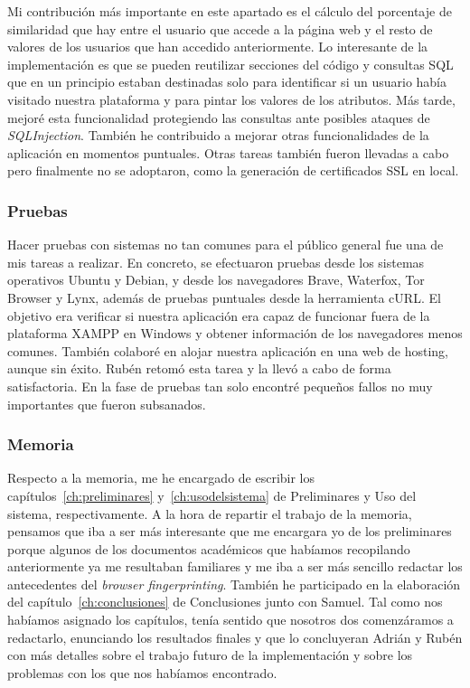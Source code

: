 Mi contribución más importante en este apartado es el cálculo del porcentaje de similaridad que hay entre el usuario que accede a la página web y el resto de valores de los usuarios que han accedido anteriormente. Lo interesante de la implementación es que se pueden reutilizar secciones del código y consultas SQL que en un principio estaban destinadas solo para identificar si un usuario había visitado nuestra plataforma y para pintar los valores de los atributos. Más tarde, mejoré esta funcionalidad protegiendo las consultas ante posibles ataques de \textit{SQLInjection}. También he contribuido a mejorar otras funcionalidades de la aplicación en momentos puntuales. Otras tareas también fueron llevadas a cabo pero finalmente no se adoptaron, como la generación de certificados SSL en local. \par 

\subsubsection{Pruebas}

Hacer pruebas con sistemas no tan comunes para el público general fue una de mis tareas a realizar. En concreto, se efectuaron pruebas desde los sistemas operativos Ubuntu y Debian, y desde los navegadores Brave, Waterfox, Tor Browser y Lynx, además de pruebas puntuales desde la herramienta cURL. El objetivo era verificar si nuestra aplicación era capaz de funcionar fuera de la plataforma XAMPP en Windows y obtener información de los navegadores menos comunes. También colaboré en alojar nuestra aplicación en una web de hosting, aunque sin éxito. Rubén retomó esta tarea y la llevó a cabo de forma satisfactoria. En la fase de pruebas tan solo encontré pequeños fallos no muy importantes que fueron subsanados.

\subsubsection{Memoria}

Respecto a la memoria, me he encargado de escribir los capítulos~\ref{ch:preliminares} y~\ref{ch:usodelsistema} de Preliminares y Uso del sistema, respectivamente. A la hora de repartir el trabajo de la memoria, pensamos que iba a ser más interesante que me encargara yo de los preliminares porque algunos de los documentos académicos que habíamos recopilando anteriormente ya me resultaban familiares y me iba a ser más sencillo redactar los antecedentes del \textit{browser fingerprinting}. También he participado en la elaboración del capítulo~\ref{ch:conclusiones} de Conclusiones junto con Samuel. Tal como nos habíamos asignado los capítulos, tenía sentido que nosotros dos comenzáramos a redactarlo, enunciando los resultados finales y que lo concluyeran Adrián y Rubén con más detalles sobre el trabajo futuro de la implementación y sobre los problemas con los que nos habíamos encontrado. \par 

